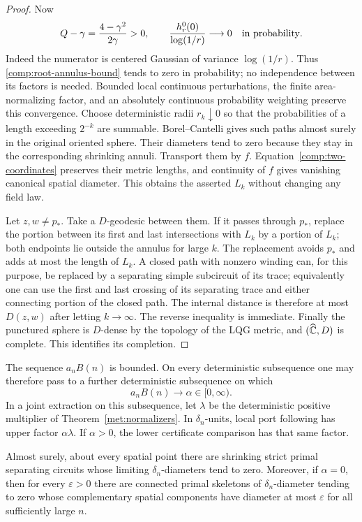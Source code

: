 \begin{proof}
Now
\[
 Q-\gamma=\frac{4-\gamma^2}{2\gamma}>0,
 \qquad
 \frac{h^0_r(0)}{\log(1/r)}\longrightarrow0
 \quad\hbox{in probability}.
\]
Indeed the numerator is centered Gaussian of variance
$\log(1/r)$.  Thus \eqref{comp:root-annulus-bound} tends to zero in
probability; no independence between its factors is needed.  Bounded
local continuous perturbations, the finite area-normalizing factor,
and an absolutely continuous probability weighting preserve this
convergence.  Choose deterministic radii $r_k\downarrow0$ so that
the probabilities of a length exceeding $2^{-k}$ are summable.
Borel--Cantelli gives such paths almost surely in the original
oriented sphere.  Their diameters tend to zero because they stay
in the corresponding shrinking annuli.  Transport them by $f$.
Equation~\eqref{comp:two-coordinates} preserves their metric lengths,
and continuity of $f$ gives vanishing canonical spatial diameter.
This obtains the asserted $L_k$ without changing any field law.

Let $z,w\ne p_*$.  Take a $D$-geodesic between them.  If it passes
through $p_*$, replace the portion between its first and last
intersections with $L_k$ by a portion of $L_k$; both endpoints lie
outside the annulus for large $k$.  The replacement avoids $p_*$ and
adds at most the length of $L_k$.  A closed path with nonzero winding
can, for this purpose, be replaced by a separating simple subcircuit
of its trace; equivalently one can use the first and last crossing
of its separating trace and either connecting portion of the closed
path.  The internal distance is therefore at most $D(z,w)$ after
letting $k\to\infty$.  The reverse inequality is immediate.
Finally the punctured sphere is $D$-dense by the topology of the LQG
metric, and $(\widehat{\mathbb C},D)$ is complete.  This identifies its completion.
\end{proof}

\begin{lemma}
\label{comp:scales}
The sequence $a_nB(n)$ is bounded.  On every deterministic subsequence
one may therefore pass to a further deterministic subsequence on
which
\begin{equation}
 \label{comp:alpha}
 a_nB(n)\longrightarrow\alpha\in[0,\infty).
\end{equation}
In a joint extraction on this subsequence, let $\lambda$ be the
deterministic positive multiplier of
Theorem~\ref{met:normalizers}.  In $\delta_n$-units, local port
following has upper factor $\alpha\lambda$.  If $\alpha>0$, the
lower certificate comparison has that same factor.

Almost surely, about every spatial point there are shrinking strict
primal separating circuits whose limiting $\delta_n$-diameters tend
to zero.  Moreover, if $\alpha=0$, then for every $\varepsilon>0$
there are connected primal skeletons of $\delta_n$-diameter tending
to zero whose complementary spatial components have diameter at
most $\varepsilon$ for all sufficiently large $n$.
\end{lemma}

